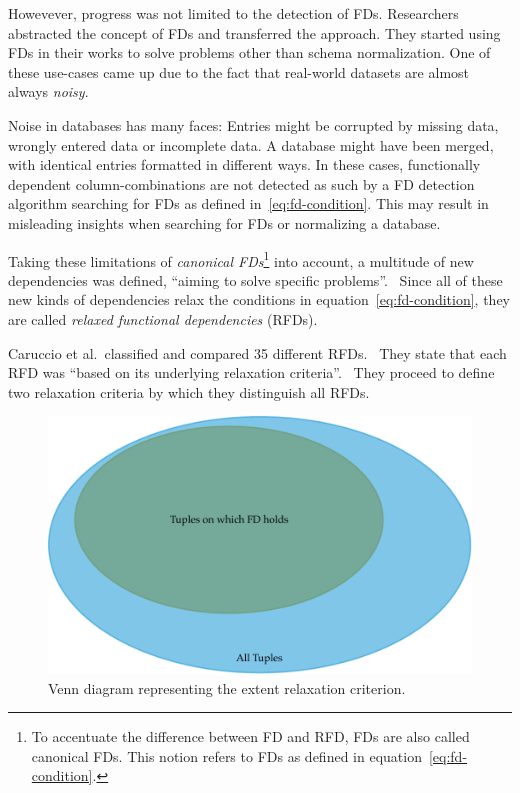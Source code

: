 Howevever, progress was not limited to the detection of FDs.
Researchers abstracted the concept of FDs and transferred the approach.
They started using FDs in their works to solve problems other than schema normalization.
One of these use-cases came up due to the fact that real-world datasets are almost always \emph{noisy}.

Noise in databases has many faces:
Entries might be corrupted by missing data, wrongly entered data or incomplete data.
A database might have been merged, with identical entries formatted in different ways.
In these cases, functionally dependent column-combinations are not detected as such by a FD detection algorithm searching for FDs as defined in~\ref{eq:fd-condition}.
This may result in misleading insights when searching for FDs or normalizing a database.

Taking these limitations of \emph{canonical FDs}\footnote{To accentuate the difference between FD and RFD, FDs are also called canonical FDs. This notion refers to FDs as defined in equation~\ref{eq:fd-condition}.} into account, a multitude of new dependencies was defined, ``aiming to solve specific problems''.~\cite[p.~147]{CAR16}
Since all of these new kinds of dependencies relax the conditions in equation~\ref{eq:fd-condition}, they are called \emph{relaxed functional dependencies} (RFDs).

Caruccio et al.\ classified and compared 35 different RFDs.~\cite[p.~151]{CAR16}
They state that each RFD was ``based on its underlying relaxation criteria''.~\cite[p.~149]{CAR16}
They proceed to define two relaxation criteria by which they distinguish all RFDs.

\begin{figure}[ht]
     \centering
     \includegraphics[width=\textwidth]{images/rfds-extent.pdf}
     \caption{Venn diagram representing the extent relaxation criterion.}
     \label{fig:rfds-extent}
 \end{figure}

